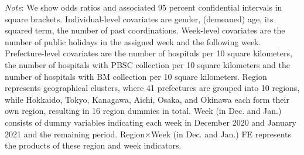 \documentclass[12pt, a4paper]{article}
\begin{document}
\begin{landscape}
\begin{table}[H]
\begin{threeparttable}
\begin{tablenotes}
\item \emph{Note}: We show odds ratios and associated 95 percent confidential intervals in square brackets. Individual-level covariates are gender, (demeaned) age, its squared term, the number of past coordinations. Week-level covariates are the number of public holidays in the assigned week and the following week. Prefecture-level covariates are the number of hospitals per 10 square kilometers, the number of hospitals with PBSC collection per 10 square kilometers and the number of hospitals with BM collection per 10 square kilometers. Region represents geographical clusters, where 41 prefectures are grouped into 10 regions, while Hokkaido, Tokyo, Kanagawa, Aichi, Osaka, and Okinawa each form their own region, resulting in 16 region dummies in total. Week (in Dec. and Jan.) consists of dummy variables indicating each week in December 2020 and January 2021 and the remaining period. Region$\times$Week (in Dec. and Jan.) FE represents the products of these region and week indicators.
\end{tablenotes}
\end{threeparttable}
\end{table}
\end{landscape}
\end{document}
